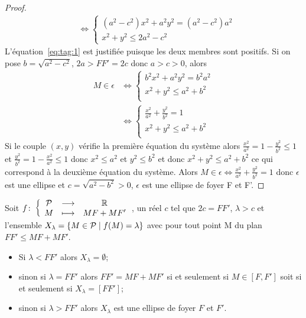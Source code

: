 \begin{proof}
\begin{align}
                   & \iff \begin{cases} (a^2-c^2)x^2 +a^2y^2 = (a^2-c^2)a^2  \\
                   x^2 + y^2 \leqslant 2a^2 -c^2\end{cases}
  \end{align}
  L'équation~\eqref{eq:tag:1} est justifiée puisque les deux membres sont
  positifs. Si on  pose \(b = \sqrt{a^2-c^2}\), \(2a>FF' = 2c\) donc \(a>c>0\),
  alors
  \begin{align}
    M \in \epsilon & \iff \begin{cases} b^2x^2 +a^2y^2 = b^2a^2 \\ x^2 + y^2
    \leqslant a^2 +b^2\\\end{cases}\\
                   & \iff \begin{cases} \frac{x^2}{a^2} +\frac{y^2}{b^2} = 1\\
                   x^2 + y^2 \leqslant a^2 +b^2 \\\end{cases}
  \end{align}
  Si le couple \((x, y)\) vérifie la première équation du système alors
  \(\frac{x^2}{a^2} = 1-\frac{y^2}{b^2}\leqslant 1\) et
  \(\frac{y^2}{b^2} = 1-\frac{x^2}{a^2} \leqslant 1\) donc \(x^2 \leqslant a^2\)
  et \(y^2 \leqslant b^2\) et donc \(x^2 + y^2 \leqslant a^2 + b^2\) ce qui
  correspond à la deuxième équation du système.
  Alors \(M \in \epsilon \iff \frac{x^2}{a^2} +\frac{y^2}{b^2} = 1\) donc
  \(\epsilon\) est une ellipse et \(c = \sqrt{a^2-b^2}>0\), \(\epsilon\) est une
  ellipse de foyer F et F'.
\end{proof}
Soit \(f\colon\left\{\begin{array}{ccc}\mathcal{P} & \longrightarrow &\mathbb{R}\\M & \longmapsto & MF + MF'\end{array}\right.\), un réel \(c\) tel que \(2c = FF'\),
\(\lambda>c\) et l'ensemble \(X_\lambda = \left\{M \in \mathcal{P}\mathrel{}\middle|\mathrel{}f(M) = \lambda\right\}\) avec
pour tout point M du plan \(FF'\leqslant MF + MF'\).
\begin{itemize}
  \item Si \(\lambda < FF'\) alors \(X_\lambda = \emptyset\);
  \item sinon si \(\lambda = FF'\) alors \(FF' = MF + MF'\) si et seulement si \(M
    \in [F, F']\) soit si et seulement si \(X_\lambda = [FF']\);
  \item sinon si \(\lambda >FF'\) alors \(X_\lambda\) est une ellipse de foyer
    \(F\) et \(F'\).
\end{itemize}

